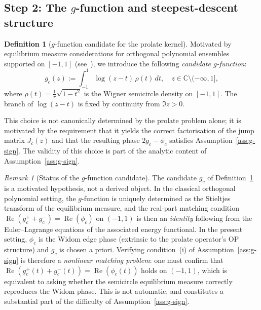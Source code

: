 \documentclass[12pt,a4paper]{amsart}
\theoremstyle{definition}
\newtheorem{definition}[theorem]{Definition}
\theoremstyle{remark}
\newtheorem{remark}[theorem]{Remark}
\begin{document}
\subsection{Step 2: The $g$-function and steepest-descent structure}
\label{sec:g-function}

\begin{definition}[$g$-function candidate for the prolate kernel]
\label{def:g-function}
Motivated by equilibrium measure considerations for orthogonal polynomial
ensembles supported on $[-1,1]$ (see~\cite{Deift1999}), we introduce the
following \emph{candidate $g$-function}:
\[
  g_c(z) := \int_{-1}^{1} \log(z-t)\,\rho(t)\,dt,
  \quad z\in\mathbb{C}\setminus(-\infty,1],
\]
where $\rho(t)=\frac{1}{\pi}\sqrt{1-t^2}$ is the Wigner semicircle density
on $[-1,1]$.
The branch of $\log(z-t)$ is fixed by continuity from $\Im z>0$.

This choice is not canonically determined by the prolate problem alone;
it is motivated by the requirement that it yields the correct factorisation
of the jump matrix $J_c(z)$ and that the resulting phase $2g_c - \phi_c$
satisfies Assumption~\ref{ass:g-sign}. The validity of this choice
is part of the analytic content of Assumption~\ref{ass:g-sign}.
\end{definition}

\begin{remark}[Status of the $g$-function candidate]
\label{rem:g-candidate-status}
The candidate $g_c$ of Definition~\ref{def:g-function} is a motivated
hypothesis, not a derived object. In the classical orthogonal polynomial
setting, the $g$-function is uniquely determined as the Stieltjes transform
of the equilibrium measure, and the real-part matching condition
$\operatorname{Re}(g_c^+ + g_c^-) = \operatorname{Re}(\phi_c)$ on $(-1,1)$
is then an \emph{identity} following from the Euler--Lagrange equations
of the associated energy functional.
In the present setting, $\phi_c$ is the Widom edge phase (extrinsic to the
prolate operator's OP structure) and $g_c$ is chosen a priori.
Verifying condition~(i) of Assumption~\ref{ass:g-sign} is therefore
a \emph{nonlinear matching problem}: one must confirm that
$\operatorname{Re}(g_c^+(t) + g_c^-(t)) = \operatorname{Re}(\phi_c(t))$
holds on $(-1,1)$, which is equivalent to asking whether the semicircle
equilibrium measure correctly reproduces the Widom phase. This is not
automatic, and constitutes a substantial part of the difficulty of
Assumption~\ref{ass:g-sign}.
\end{remark}
\end{document}
